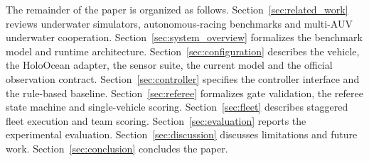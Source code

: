 The remainder of the paper is organized as follows. Section~\ref{sec:related_work} reviews underwater simulators, autonomous-racing benchmarks and multi-AUV underwater cooperation. Section~\ref{sec:system_overview} formalizes the benchmark model and runtime architecture. Section~\ref{sec:configuration} describes the vehicle, the HoloOcean adapter, the sensor suite, the current model and the official observation contract. Section~\ref{sec:controller} specifies the controller interface and the rule-based baseline. Section~\ref{sec:referee} formalizes gate validation, the referee state machine and single-vehicle scoring. Section~\ref{sec:fleet} describes staggered fleet execution and team scoring. Section~\ref{sec:evaluation} reports the experimental evaluation. Section~\ref{sec:discussion} discusses limitations and future work. Section~\ref{sec:conclusion} concludes the paper.
